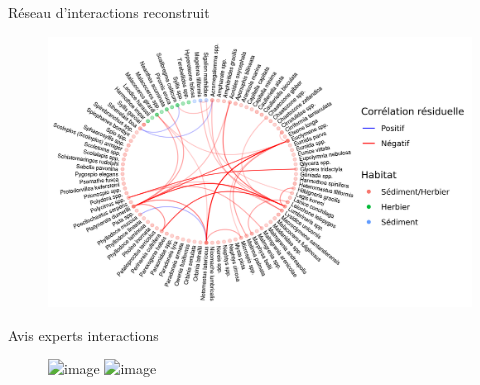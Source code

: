 \documentclass[%
]{beamer}
\begin{document}
	\begin{frame}{Réseau d'interactions reconstruit}
	\begin{figure}[t]
		\begin{center}
			\includegraphics[scale =0.85]{figs/mean-network-1.png}
		\end{center}
	\end{figure}
	\end{frame}
	
	\begin{frame}{Avis experts interactions}
	\begin{figure}[t]
		\begin{center}
			\includegraphics<1>[scale=0.07]{figs/expert-option-1-2.png}
			\includegraphics<2>[scale=0.07]{figs/expert-option-2-2.png}
		\end{center}
	\end{figure}
	\end{frame}
	
\end{document}
